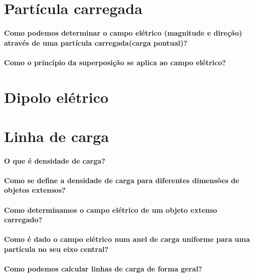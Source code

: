\section*{Partícula carregada}

  \paragraph{Como podemos determinar o campo elétrico (magnitude e direção) através de uma partícula carregada(carga pontual)?}

  \paragraph{Como o princípio da superposição se aplica ao campo elétrico?}

\section*{Dipolo elétrico}

\section*{Linha de carga}

  \paragraph{O que é densidade de carga?}

  \paragraph{Como se define a densidade de carga para diferentes dimensões de objetos extensos?}

  \paragraph{Como determinamos o campo elétrico de um objeto extenso carregado?}

  \paragraph{Como é dado o campo elétrico num anel de carga uniforme para uma partícula no seu eixo central?}

  \paragraph{Como podemos calcular linhas de carga de forma geral?}

